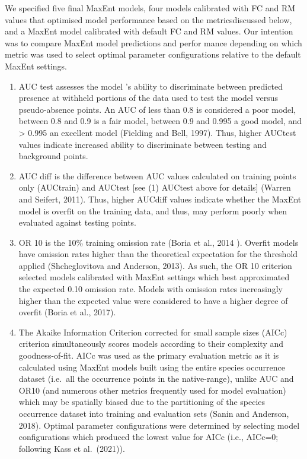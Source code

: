 \documentclass[
  authoryear,
  preprint,
  3p,
  onecolumn]{elsarticle}
\begin{document}
We specified five final MaxEnt models, four models calibrated with FC
and RM values that optimised model performance based on the
metricsdiscussed below, and a MaxEnt model calibrated with default FC
and RM values. Our intention was to compare MaxEnt model predictions and
perfor mance depending on which metric was used to select optimal
parameter configurations relative to the default MaxEnt settings.

\begin{enumerate}
\def\labelenumi{(\arabic{enumi})}
\item
  AUC test assesses the model 's ability to discriminate between
  predicted presence at withheld portions of the data used to test the
  model versus pseudo-absence points. An AUC of less than 0.8 is
  considered a poor model, between 0.8 and 0.9 is a fair model, between
  0.9 and 0.995 a good model, and \textgreater{} 0.995 an excellent
  model (Fielding and Bell, 1997). Thus, higher AUCtest values indicate
  increased ability to discriminate between testing and background
  points.
\item
  AUC diff is the difference between AUC values calculated on training
  points only (AUCtrain) and AUCtest {[}see (1) AUCtest above for
  details{]} (Warren and Seifert, 2011). Thus, higher AUCdiff values
  indicate whether the MaxEnt model is overfit on the training data, and
  thus, may perform poorly when evaluated against testing points.
\item
  OR 10 is the 10\% training omission rate (Boria et al., 2014 ).
  Overfit models have omission rates higher than the theoretical
  expectation for the threshold applied (Shcheglovitova and Anderson,
  2013). As such, the OR 10 criterion selected models calibrated with
  MaxEnt settings which best approximated the expected 0.10 omission
  rate. Models with omission rates increasingly higher than the expected
  value were considered to have a higher degree of overfit (Boria et
  al., 2017).
\item
  The Akaike Information Criterion corrected for small sample sizes
  (AICc) criterion simultaneously scores models according to their
  complexity and goodness-of-fit. AICc was used as the primary
  evaluation metric as it is calculated using MaxEnt models built using
  the entire species occurrence dataset (i.e.~all the occurrence points
  in the native-range), unlike AUC and OR10 (and numerous other metrics
  frequently used for model evaluation) which may be spatially biased
  due to the partitioning of the species occurrence dataset into
  training and evaluation sets (Sanin and Anderson, 2018). Optimal
  parameter configurations were determined by selecting model
  configurations which produced the lowest value for AICc (i.e., AICc=0;
  following Kass et al.~(2021)).
\end{enumerate}
\end{document}
